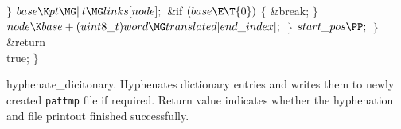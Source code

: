 \4${}\}{}$\2\6
${}\\{base}\K\\{pt}\MG\|t\MG\\{links}[\\{node}];{}$\6
\&{if} ${}(\\{base}\E\T{0}){}$\5
${}\{{}$\1\6
\&{break};\6
\4${}\}{}$\2\6
${}\\{node}\K\\{base}+(\\{uint8\_t})\\{word}\MG\\{translated}[\\{end%
\_index}];{}$\6
\4${}\}{}$\2\6
${}\\{start\_pos}\PP;{}$\6
\4${}\}{}$\2\6
\&{return} \\{true};\6
\4${}\}{}$\2\par
\fi

hyphenate\_dicitonary.
Hyphenates dictionary entries and writes them to newly created {\tt pattmp}
file if required. Return value indicates
whether the hyphenation and file printout finished successfully.

